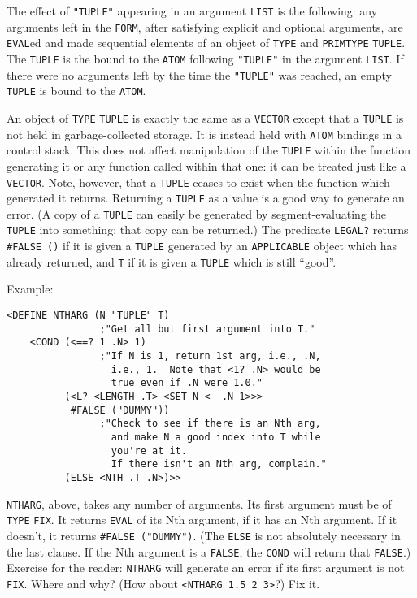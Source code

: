 \documentclass[a4paper,]{article}
\begin{document}
The effect of \texttt{"TUPLE"} appearing in an argument \texttt{LIST} is the following: any arguments left in the
\texttt{FORM}, after satisfying explicit and optional arguments, are \texttt{EVAL}ed and made sequential elements of an
object of \texttt{TYPE} and \texttt{PRIMTYPE} \texttt{TUPLE}. The \texttt{TUPLE} is the bound to the \texttt{ATOM}
following \texttt{"TUPLE"} in the argument \texttt{LIST}. If there were no arguments left by the time the \texttt{"TUPLE"}
was reached, an empty \texttt{TUPLE} is bound to the \texttt{ATOM}.

An object of \texttt{TYPE} \texttt{TUPLE} is exactly the same as a \texttt{VECTOR} except that
a \texttt{TUPLE} is not held in garbage-collected storage. It is instead held with \texttt{ATOM} bindings in a control
stack. This does not affect manipulation of the \texttt{TUPLE} within the function generating it or any function called
within that one: it can be treated just like a \texttt{VECTOR}. Note, however, that a \texttt{TUPLE} ceases to exist when
the function which generated it returns. Returning a \texttt{TUPLE} as a value is a good way to generate an error. (A copy
of a \texttt{TUPLE} can easily be generated by segment-evaluating the \texttt{TUPLE} into something; that copy can be
returned.) The predicate \texttt{LEGAL?} returns \texttt{\#FALSE\ ()} if it is given a
\texttt{TUPLE} generated by an \texttt{APPLICABLE} object which has already returned, and \texttt{T} if it is given a
\texttt{TUPLE} which is still ``good''.

Example:

\begin{verbatim}
<DEFINE NTHARG (N "TUPLE" T)
                ;"Get all but first argument into T."
    <COND (<==? 1 .N> 1)
                ;"If N is 1, return 1st arg, i.e., .N,
                  i.e., 1.  Note that <1? .N> would be
                  true even if .N were 1.0."
          (<L? <LENGTH .T> <SET N <- .N 1>>>
           #FALSE ("DUMMY"))
                ;"Check to see if there is an Nth arg,
                  and make N a good index into T while
                  you're at it.
                  If there isn't an Nth arg, complain."
          (ELSE <NTH .T .N>)>>
\end{verbatim}

\texttt{NTHARG}, above, takes any number of arguments. Its first argument must be of \texttt{TYPE} \texttt{FIX}. It returns
\texttt{EVAL} of its Nth argument, if it has an Nth argument. If it doesn't, it returns \texttt{\#FALSE\ ("DUMMY")}. (The
\texttt{ELSE} is not absolutely necessary in the last clause. If the Nth argument is a \texttt{FALSE}, the \texttt{COND}
will return that \texttt{FALSE}.) Exercise for the reader: \texttt{NTHARG} will generate an error if its first argument is
not \texttt{FIX}. Where and why? (How about \texttt{\textless{}NTHARG\ 1.5\ 2\ 3\textgreater{}}?) Fix it.
\end{document}
